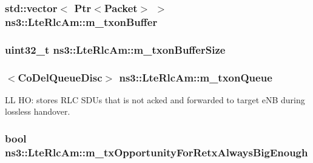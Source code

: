 \subsubsection[{\texorpdfstring{m\+\_\+txon\+Buffer}{m_txonBuffer}}]{\setlength{\rightskip}{0pt plus 5cm}std\+::vector$<$ {\bf Ptr}$<${\bf Packet}$>$ $>$ ns3\+::\+Lte\+Rlc\+Am\+::m\+\_\+txon\+Buffer\hspace{0.3cm}{\ttfamily [private]}}\hypertarget{classns3_1_1LteRlcAm_ad8ba4549a7c78cfe0e528d2e9cc465f8}{}\label{classns3_1_1LteRlcAm_ad8ba4549a7c78cfe0e528d2e9cc465f8}
\subsubsection[{\texorpdfstring{m\+\_\+txon\+Buffer\+Size}{m_txonBufferSize}}]{\setlength{\rightskip}{0pt plus 5cm}uint32\+\_\+t ns3\+::\+Lte\+Rlc\+Am\+::m\+\_\+txon\+Buffer\+Size\hspace{0.3cm}{\ttfamily [private]}}\hypertarget{classns3_1_1LteRlcAm_a3e8db6b5bc1d3fcc215d554e8d347eda}{}\label{classns3_1_1LteRlcAm_a3e8db6b5bc1d3fcc215d554e8d347eda}
\subsubsection[{\texorpdfstring{m\+\_\+txon\+Queue}{m_txonQueue}}]{$<${\bf Co\+Del\+Queue\+Disc}$>$ ns3\+::\+Lte\+Rlc\+Am\+::m\+\_\+txon\+Queue\hspace{0.3cm}{\ttfamily [private]}}\hypertarget{classns3_1_1LteRlcAm_af5e3bc804493e8dcebe740373e5ce2a2}{}\label{classns3_1_1LteRlcAm_af5e3bc804493e8dcebe740373e5ce2a2}
LL HO\+: stores R\+LC S\+D\+Us that is not acked and forwarded to target e\+NB during lossless handover. 
\subsubsection[{\texorpdfstring{m\+\_\+tx\+Opportunity\+For\+Retx\+Always\+Big\+Enough}{m_txOpportunityForRetxAlwaysBigEnough}}]{\setlength{\rightskip}{0pt plus 5cm}bool ns3\+::\+Lte\+Rlc\+Am\+::m\+\_\+tx\+Opportunity\+For\+Retx\+Always\+Big\+Enough\hspace{0.3cm}{\ttfamily [private]}}\hypertarget{classns3_1_1LteRlcAm_a7f5585ee93a02f0fe8f9c3a2679a4866}{}\label{classns3_1_1LteRlcAm_a7f5585ee93a02f0fe8f9c3a2679a4866}
